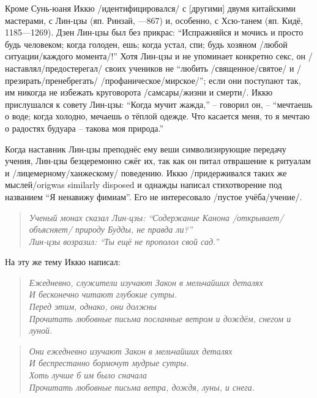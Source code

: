 \begin{ver}
Кроме Сунь-юаня Иккю /идентифицировался/ с [другими] двумя китайскими
мастерами, с Лин-цзы (яп. Ринзай, ---867) и, особенно, с
Хсю-танем (яп. Кидё, 1185---1269). Дзен Лин-цзы был без
прикрас: ``Испражняйся и мочись и просто будь
человеком; когда голоден, ешь; когда устал, спи; будь хозяном /любой
ситуации/каждого момента/!''
Хотя Лин-цзы и не упоминает конкретно секс, он
/наставлял/предостерегал/ своих учеников не ``любить /священное/святое/ и
/презирать/пренебрегать/ /профаническое/мирское/''; если они поступают
так, им никогда не избежать круговорота /самсары/жизни и смерти/. 
Иккю прислушался к совету Лин-цзы: ``Когда мучит жажда,'' -- говорил
он, -- ``мечтаешь о воде; когда холодно, мечаешь о тёплой одежде. Что
касается меня, то я мечтаю о радостях будуара -- такова моя природа.''
\end{ver}

\begin{ver}
  Когда наставник Лин-цзы преподнёс ему веши символизирующие передачу
  учения, Лин-цзы безцеремонно сжёг их, так как он питал отврашение к
  ритуалам и /лицемерному/ханжескому/ поведению. Иккю /придерживался
  таких же мыслей/orig{was similarly disposed} и однажды написал
  стихотворение под названием ``Я ненавижу фимиам''. Его
  не интересовало /пустое учёба/учение/.
\end{ver}

\begin{ver}
  \begin{verse}\it
    Ученый монах сказал Лин-цзы: ``Содержание Канона
    /открывает/объясняет/ природу Будды, не правда ли?''\\
    Лин-цзы возразил: ``Ты ещё не прополол свой сад.''
  \end{verse}
\end{ver}

\begin{ver}
  На эту же тему Иккю написал:
\end{ver}

\begin{ver}
  \begin{verse}\it
    Ежедневно, служители изучают Закон в мельчайших деталях\\
    И бесконечно читают глубокие сутры.\\
    Перед этим, однако, они должны\\
    Прочитать любовные письма посланные ветром и дождём, снегом и луной. 
  \end{verse}
\end{ver}

\begin{ver}[1]
  \begin{verse}\it
    Они ежедневно изучают Закон в мельчайших деталях\\
    И беспрестанно бормочут мудрые сутры.\\
    Хоть лучше б им было сначала\\
    Прочитать любовные письма ветра, дождя, луны, и снега.
  \end{verse}
\end{ver}

